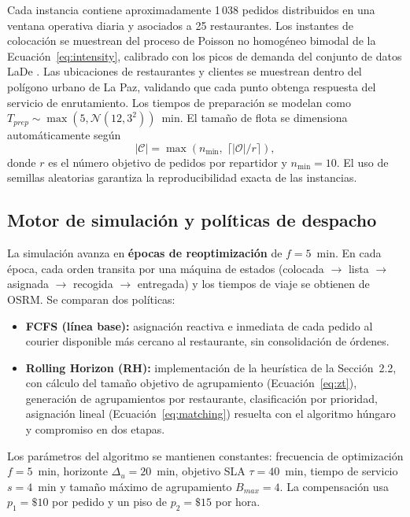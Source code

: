 \documentclass[12pt,letterpaper]{article}
\begin{document}
Cada instancia contiene aproximadamente 1\,038 pedidos distribuidos en una ventana
operativa diaria y asociados a 25 restaurantes. Los instantes de colocación se
muestrean del proceso de Poisson no homogéneo bimodal de la
Ecuación~\eqref{eq:intensity}, calibrado con los picos de demanda del conjunto de
datos LaDe \citep{Wu2023LaDe}. Las ubicaciones de restaurantes y clientes se
muestrean dentro del polígono urbano de La Paz, validando que cada punto obtenga
respuesta del servicio de enrutamiento. Los tiempos de preparación se modelan como
$T_{prep}\sim\max(5,\mathcal{N}(12,3^2))$~min. El tamaño de flota se dimensiona
automáticamente según
\begin{equation}
	|\mathcal{C}| = \max\!\left(n_{\min},\; \lceil |\mathcal{O}|/r \rceil\right),
	\label{eq:fleet}
\end{equation}
donde $r$ es el número objetivo de pedidos por repartidor y $n_{\min}=10$. El uso
de semillas aleatorias garantiza la reproducibilidad exacta de las instancias.

\subsection{Motor de simulación y políticas de despacho}

La simulación avanza en \textbf{épocas de reoptimización} de $f=5$~min. En cada
época, cada orden transita por una máquina de estados (colocada
$\rightarrow$ lista $\rightarrow$ asignada $\rightarrow$ recogida
$\rightarrow$ entregada) y los tiempos de viaje se obtienen de OSRM. Se comparan
dos políticas:

\begin{itemize}
	\item \textbf{FCFS (línea base):} asignación reactiva e inmediata de cada
	      pedido al courier disponible más cercano al restaurante, sin
	      consolidación de órdenes.
	\item \textbf{Rolling Horizon (RH):} implementación de la heurística de la
	      Sección~2.2, con cálculo del tamaño objetivo de agrupamiento
	      (Ecuación~\ref{eq:zt}), generación de agrupamientos por restaurante,
	      clasificación por prioridad, asignación lineal
	      (Ecuación~\ref{eq:matching}) resuelta con el algoritmo húngaro
	      \citep{Kuhn1955} y compromiso en dos etapas.
\end{itemize}

Los parámetros del algoritmo se mantienen constantes: frecuencia de optimización
$f=5$~min, horizonte $\Delta_u=20$~min, objetivo SLA $\tau=40$~min, tiempo de
servicio $s=4$~min y tamaño máximo de agrupamiento $B_{max}=4$. La compensación
usa $p_1=\$10$ por pedido y un piso de $p_2=\$15$ por hora.
\end{document}
